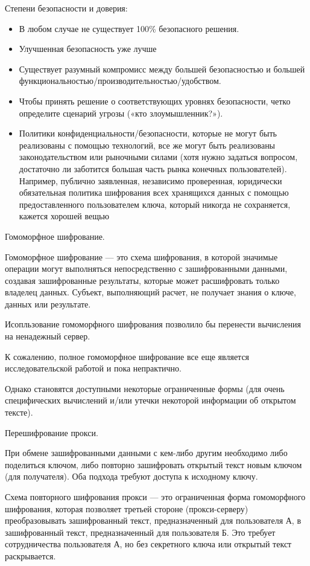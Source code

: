 Степени безопасности и доверия:
\begin{itemize}
    \item В любом случае не существует 100\% безопасного решения.
    \item Улучшенная безопасность уже лучше
    \item Существует разумный компромисс между большей безопасностью и большей
        функциональностью/производительностью/удобством.
    \item Чтобы принять решение о соответствующих уровнях безопасности, четко определите сценарий
        угрозы («кто злоумышленник?»).
    \item Политики конфиденциальности/безопасности, которые не могут быть реализованы с помощью
        технологий, все же могут быть реализованы законодательством или рыночными силами (хотя
        нужно задаться вопросом, достаточно ли заботится большая часть рынка конечных пользователей).
        Например, публично заявленная, независимо проверенная, юридически обязательная политика
        шифрования всех хранящихся данных с помощью предоставленного пользователем ключа, который
        никогда не сохраняется, кажется хорошей вещью
\end{itemize}

Гомоморфное шифрование.

Гомоморфное шифрование — это схема шифрования, в которой значимые операции могут выполняться
непосредственно с зашифрованными данными, создавая зашифрованные результаты, которые может
расшифровать только владелец данных. Субъект, выполняющий расчет, не получает знания о ключе,
данных или результате.

Исопльзование гомоморфного шифрования позволило бы перенести вычисления на ненадежный сервер.

К сожалению, полное гомоморфное шифрование все еще является исследовательской работой и пока
непрактично.

Однако становятся доступными некоторые ограниченные формы (для очень специфических вычислений
и/или утечки некоторой информации об открытом тексте).


Перешифрование прокси.

При обмене зашифрованными данными с кем-либо другим необходимо либо поделиться ключом, либо
повторно зашифровать открытый текст новым ключом (для получателя). Оба подхода требуют доступа
к исходному ключу.

Схема повторного шифрования прокси — это ограниченная форма гомоморфного шифрования, которая
позволяет третьей стороне (прокси-серверу) преобразовывать зашифрованный текст, предназначенный
для пользователя А, в зашифрованный текст, предназначенный для пользователя Б. Это требует
сотрудничества пользователя А, но без секретного ключа или открытый текст раскрывается.

